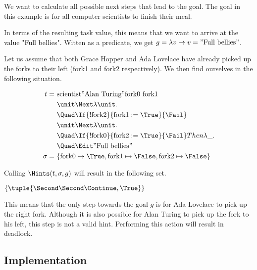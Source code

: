 We want to calculate all possible next steps that lead to the goal.
The goal in this example is for all computer scientists to finish their meal.

In terms of the resulting task value, this means that we want to arrive at the value "Full bellies".
Witten as a predicate, we get $g=\lambda v\rightarrow v = "\text{Full bellies}"$.

Let us assume that both Grace Hopper and Ada Lovelace have already picked up the forks to their left (fork1 and fork2 respectively).
We then find ourselves in the following situation.


\begin{align*}
t =\ &\text{scientist} "\text{Alan Turing}" \text{fork0}\ \text{fork1} \And\\
    &\unit \Next \lambda \unit .\\
    &\Quad \If{!\text{fork2}}{\text{fork1} := \True}{\Fail} \And\\
    &\unit \Next \lambda \unit .\\
    &\Quad \If{!\text{fork0}}{\text{fork2} := \True}{\Fail} Then \lambda \_.\\
    &\Quad \Edit "\text{Full bellies}"\\
\sigma =\ &\{\text{fork0}\mapsto \True, \text{fork1}\mapsto \False,\text{fork2}\mapsto \False\}
\end{align*}

Calling $\Hints(t,\sigma,g)$ will result in the following set.

$\{ \tuple{\Second\Second\Continue,\True}\}$

This means that the only step towards the goal $g$ is for Ada Lovelace to pick up the right fork.
Although it is also possible for Alan Turing to pick up the fork to his left, this step is not a valid hint.
Performing this action will result in deadlock.


\subsection{Implementation}
\label{sec:implementation}

